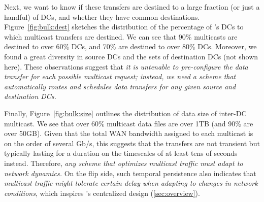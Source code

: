 \vspace{0.1cm}
Next, we want to know if these transfers are destined to
a large fraction (or just a handful) of DCs, and whether
they have common destinations.
Figure~\ref{fig:bulk:dest} sketches the distribution of the
percentage of \company's DCs to which multicast
transfers are destined.
We can see that 90\% multicasts are destined
to over 60\% DCs, and 70\% are destined
to over 80\% DCs.
Moreover, we found a great diversity in
source DCs and the sets of destination DCs (not shown here).
These observations suggest that {\em it is untenable
to pre-configure the data transfer for each possible multicast
request; instead, we need a scheme that automatically routes and
schedules data transfers for any given source and destination
DCs.}


Finally, Figure~\ref{fig:bulk:size} outlines the distribution of data size of inter-DC multicast.
We see that over 60\% multicast data files are over 1TB
(and 90\% are over 50GB).
Given that the total WAN bandwidth assigned to each multicast
is on the order of several Gb/s,
this suggests that the transfers are not transient but
typically lasting for a duration on the timescales of at least tens of
seconds instead.
Therefore, {\em any scheme that optimizes multicast traffic must
adapt to network dynamics.}
On the flip side, such temporal persistence
also indicates that {\em multicast traffic might tolerate certain delay
when adapting to changes in network conditions}, which inspires
\name's centralized design (\Section\ref{sec:overview}).


